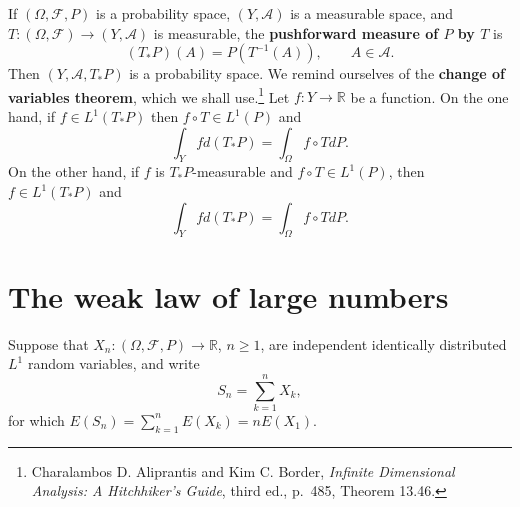 \documentclass{article}
\theoremstyle{definition}
\begin{document}
If $(\Omega,\mathscr{F},P)$ is a probability space,
 $(Y,\mathscr{A})$ is a measurable space, and
$T:(\Omega,\mathscr{F}) \to (Y,\mathscr{A})$ is measurable,
the \textbf{pushforward measure of $P$ by $T$} is 
\[
(T_*P)(A) = P(T^{-1}(A)), \qquad A \in \mathscr{A}.
\]
Then $(Y,\mathscr{A},T_*P)$ is a probability space.
We remind ourselves of the \textbf{change of variables theorem}, which we shall use.\footnote{Charalambos D. Aliprantis
and Kim C. Border, {\em Infinite Dimensional Analysis: A Hitchhiker's Guide}, third ed., p.~485, Theorem 13.46.}
Let $f:Y \to \mathbb{R}$ be a function. On the one hand, if $f \in L^1(T_*P)$ then
 $f \circ T \in L^1(P)$ and
\begin{equation}
\int_Y f d(T_*P) = \int_\Omega f \circ T dP.
\label{COV}
\end{equation}
On the other hand, if $f$ is $T_*P$-measurable and $f \circ T \in L^1(P)$, then 
$f \in L^1(T_*P)$ and
\[
\int_Y f d(T_*P) = \int_\Omega f \circ T dP.
\]


\section{The weak law of large numbers}
Suppose that
$X_n:(\Omega,\mathscr{F},P) \to \mathbb{R}$, $n \geq 1$, are independent
identically distributed $L^1$ random variables, and write
\[
S_n = \sum_{k=1}^n X_k,
\]
for which $E(S_n) = \sum_{k=1}^n E(X_k) = nE(X_1)$.
\end{document}
